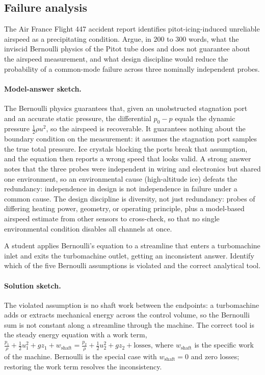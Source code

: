 \subsection*{Failure analysis}

\begin{exercise}
The Air France Flight 447 accident report \cite{acc:bea-af447}
identifies pitot-icing-induced unreliable airspeed as a precipitating
condition. Argue, in $200$ to $300$ words, what the inviscid
Bernoulli physics of the Pitot tube does and does not guarantee
about the airspeed measurement, and what design discipline would
reduce the probability of a common-mode failure across three
nominally independent probes.

\paragraph{Model-answer sketch.} The Bernoulli physics guarantees
that, given an unobstructed stagnation port and an accurate static
pressure, the differential $p_0 - p$ equals the dynamic pressure
$\tfrac12\rho u^2$, so the airspeed is recoverable. It guarantees
nothing about the boundary condition on the measurement: it assumes
the stagnation port samples the true total pressure. Ice crystals
blocking the ports break that assumption, and the equation then reports
a wrong speed that looks valid. A strong answer notes that the three
probes were independent in wiring and electronics but shared one
environment, so an environmental cause (high-altitude ice) defeats the
redundancy: independence in design is not independence in failure
under a common cause. The design discipline is diversity, not just
redundancy: probes of differing heating power, geometry, or operating
principle, plus a model-based airspeed estimate from other sensors to
cross-check, so that no single environmental condition disables all
channels at once.
\end{exercise}

\begin{exercise}
A student applies Bernoulli's equation to a streamline that enters
a turbomachine inlet and exits the turbomachine outlet, getting an
inconsistent answer. Identify which of the five Bernoulli
assumptions is violated and the correct analytical tool.

\paragraph{Solution sketch.} The violated assumption is no shaft work
between the endpoints: a turbomachine adds or extracts mechanical
energy across the control volume, so the Bernoulli sum is not constant
along a streamline through the machine. The correct tool is the steady
energy equation with a work term, $\tfrac{p_1}\rho + \tfrac12 u_1^2 +
g z_1 + w_\text{shaft} = \tfrac{p_2}\rho + \tfrac12 u_2^2 + g z_2 +
\text{losses}$, where $w_\text{shaft}$ is the specific work of the
machine. Bernoulli is the special case with $w_\text{shaft} = 0$ and
zero losses; restoring the work term resolves the inconsistency.
\end{exercise}

